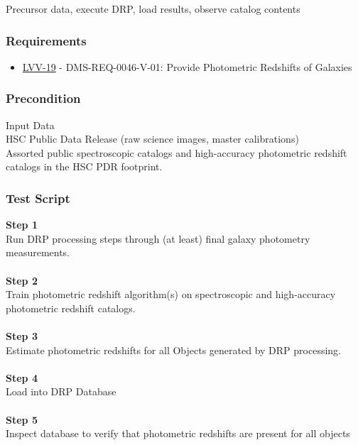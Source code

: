 Precursor data, execute DRP, load results, observe catalog contents

\hypertarget{requirements-45}{%
\subsubsection{Requirements}\label{requirements-45}}

\begin{itemize}
\tightlist
\item
  \href{https://jira.lsstcorp.org/browse/LVV-19}{LVV-19} -
  DMS-REQ-0046-V-01: Provide Photometric Redshifts of Galaxies
\end{itemize}

\hypertarget{precondition-4}{%
\subsubsection{Precondition}\label{precondition-4}}

Input Data\\
HSC Public Data Release (raw science images, master calibrations)\\
Assorted public spectroscopic catalogs and high-accuracy photometric
redshift catalogs in the HSC PDR footprint.

\hypertarget{test-script-45}{%
\subsubsection{Test Script}\label{test-script-45}}

\textbf{Step 1}\\
Run DRP processing steps through (at least) final galaxy photometry
measurements.\\
~\\
\textbf{Step 2}\\
Train photometric redshift algorithm(s) on spectroscopic and
high-accuracy photometric redshift catalogs.\\
~\\
\textbf{Step 3}\\
Estimate photometric redshifts for all Objects generated by DRP
processing.\\
~\\
\textbf{Step 4}\\
Load into DRP Database\\
~\\
\textbf{Step 5}\\
Inspect database to verify that photometric redshifts are present for
all objects\\
~\\

